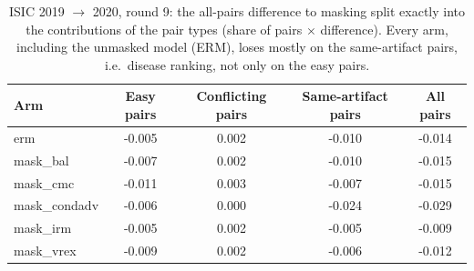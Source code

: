 \begin{table}[H]\centering\scriptsize
\caption{ISIC 2019 $\to$ 2020, round 9: the all-pairs difference to masking split exactly into the contributions of the pair types (share of pairs $\times$ difference). Every arm, including the unmasked model (ERM), loses mostly on the same-artifact pairs, i.e.\ disease ranking, not only on the easy pairs.}\label{tab:decomp}
\begin{tabular}{lcccc}\toprule
Arm & Easy pairs & Conflicting pairs & Same-artifact pairs & All pairs \\\midrule
erm & -0.005 & 0.002 & -0.010 & -0.014 \\
mask\_bal & -0.007 & 0.002 & -0.010 & -0.015 \\
mask\_cmc & -0.011 & 0.003 & -0.007 & -0.015 \\
mask\_condadv & -0.006 & 0.000 & -0.024 & -0.029 \\
mask\_irm & -0.005 & 0.002 & -0.005 & -0.009 \\
mask\_vrex & -0.009 & 0.002 & -0.006 & -0.012 \\
\bottomrule\end{tabular}
\end{table}
